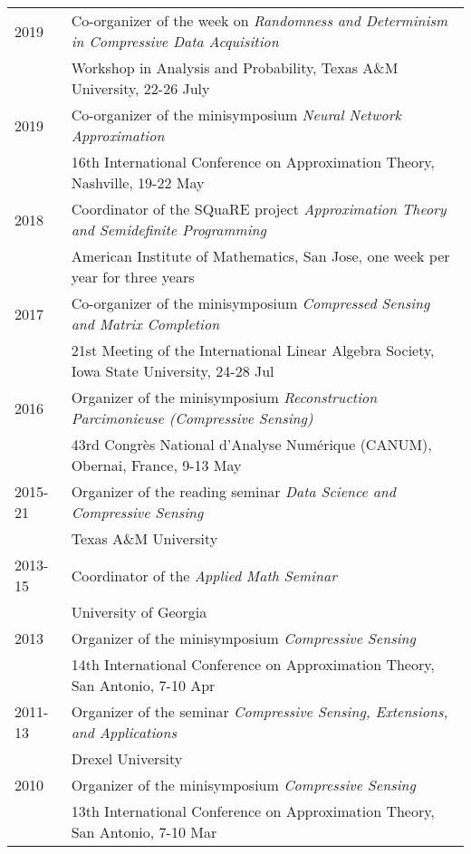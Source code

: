 \documentclass[11pt]{article}
\begin{document}
\begin{tabular}{ll}
2019 & Co-organizer of the week on {\sl Randomness and Determinism in Compressive Data Acquisition}\\
& Workshop in Analysis and Probability, Texas A\&M University,  22-26 July\\
2019 & Co-organizer of the minisymposium {\sl Neural Network Approximation}\\
& 16th International Conference on Approximation Theory, Nashville, 19-22 May\\
2018 & Coordinator of the SQuaRE project {\sl Approximation Theory and Semidefinite Programming}\\
& American Institute of Mathematics, San Jose, one week per year for three years\\
2017 & Co-organizer of the minisymposium {\sl Compressed Sensing and Matrix Completion}\\
& 
21st Meeting of the International Linear Algebra Society,
Iowa State University, 24-28 Jul\\
2016 & Organizer of the minisymposium {\sl Reconstruction Parcimonieuse (Compressive Sensing)}\\
& 43rd Congr\`{e}s National d'Analyse Num\'{e}rique (CANUM), Obernai, France, 9-13 May\\
2015-21 & Organizer of the reading seminar {\sl Data Science and Compressive Sensing}\\
& Texas A\&M University\\
2013-15 & Coordinator of the {\sl Applied Math Seminar}\\
& University of Georgia\\
2013 & Organizer of the minisymposium {\sl Compressive Sensing}\\
& 14th International Conference on Approximation Theory, San Antonio, 7-10 Apr\\
2011-13 & Organizer of the seminar {\sl Compressive Sensing, Extensions, and Applications}\\
& Drexel University\\
2010 & Organizer of the minisymposium {\sl Compressive Sensing}\\
& 13th International Conference on Approximation Theory, San Antonio, 7-10 Mar\\

\end{tabular}
\end{document}
